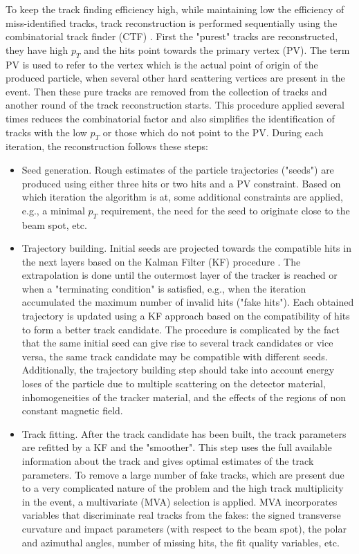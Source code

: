 \begin{small}
To keep the track finding efficiency high, while maintaining low the efficiency of miss-identified tracks, track reconstruction is performed sequentially using the combinatorial track finder (CTF) \cite{combined_track_finding}. First the "purest" tracks are reconstructed, they have high $p_T$ and the hits point towards the primary vertex (PV). The term PV is used to refer to the vertex which is the actual point of origin of the produced particle, when several other hard scattering vertices are present in the event. Then these pure tracks are removed from the collection of tracks and another round of the track reconstruction starts. This procedure applied several times reduces the combinatorial factor and also simplifies the identification of tracks with the low $p_T$ or those which do not point to the PV. During each iteration, the reconstruction follows these steps:

\begin{itemize}
\item Seed generation. Rough estimates of the particle trajectories ("seeds") are produced using either three hits or two hits and a PV constraint. Based on which iteration the algorithm is at, some additional constraints are applied, e.g., a minimal $p_T$ requirement, the need for the seed to originate close to the beam spot, etc. 
\item Trajectory building. Initial seeds are projected towards the compatible hits in the next layers based on the Kalman Filter (KF) procedure \cite{Kalman_filter}. The extrapolation is done until the outermost layer of the tracker is reached or when a "terminating condition" is satisfied, e.g., when the iteration accumulated the maximum number of invalid hits ("fake hits"). Each obtained trajectory is updated using a KF approach based on the compatibility of hits to form a better track candidate. The procedure is complicated by the fact that the same initial seed can give rise to several track candidates or vice versa, the same track candidate may be compatible with different seeds. Additionally, the trajectory building step should take into account energy loses of the particle due to multiple scattering on the detector material, inhomogeneities of the tracker material, and the effects of the regions of non constant magnetic field. 
\item Track fitting. After the track candidate has been built, the track parameters are refitted by a KF and the "smoother". This step uses the full available information about the track and gives optimal estimates of the track parameters. To remove a large number of fake tracks, which are present due to a very complicated nature of the problem and the high track multiplicity in the event, a multivariate (MVA) selection is applied. MVA incorporates variables that discriminate real tracks from the fakes: the signed transverse curvature and impact parameters (with respect to the beam spot), the polar and azimuthal angles, number of missing hits, the fit quality variables, etc. 
\end{itemize}


\end{small}
